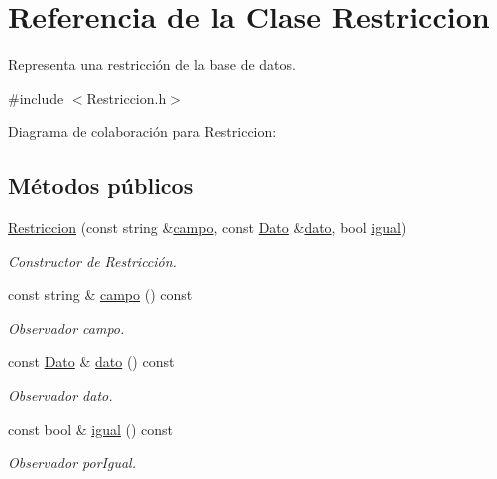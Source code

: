 \hypertarget{classRestriccion}{\section{Referencia de la Clase Restriccion}
\label{classRestriccion}
}


Representa una restricción de la base de datos.  




{\ttfamily \#include $<$Restriccion.\+h$>$}



Diagrama de colaboración para Restriccion\+:
\subsection*{Métodos públicos}
\begin{DoxyCompactItemize}
\item 
\hyperlink{classRestriccion_a6a2bb9363d1083319784caec16d9c47f}{Restriccion} (const string \&\hyperlink{classRestriccion_abee29e2435df3c0c2c8dd6330c7ad174}{campo}, const \hyperlink{classDato}{Dato} \&\hyperlink{classRestriccion_ac9b624d6ed5510aabb52ff68b77ce2f2}{dato}, bool \hyperlink{classRestriccion_ad1a9be4996f3ab4d9a26853c0b96f387}{igual})
\begin{DoxyCompactList}\small\item\em Constructor de Restricción. \end{DoxyCompactList}\item 
const string \& \hyperlink{classRestriccion_abee29e2435df3c0c2c8dd6330c7ad174}{campo} () const 
\begin{DoxyCompactList}\small\item\em Observador campo. \end{DoxyCompactList}\item 
const \hyperlink{classDato}{Dato} \& \hyperlink{classRestriccion_ac9b624d6ed5510aabb52ff68b77ce2f2}{dato} () const 
\begin{DoxyCompactList}\small\item\em Observador dato. \end{DoxyCompactList}\item 
const bool \& \hyperlink{classRestriccion_ad1a9be4996f3ab4d9a26853c0b96f387}{igual} () const 
\begin{DoxyCompactList}\small\item\em Observador por\+Igual. \end{DoxyCompactList}\end{DoxyCompactItemize}
